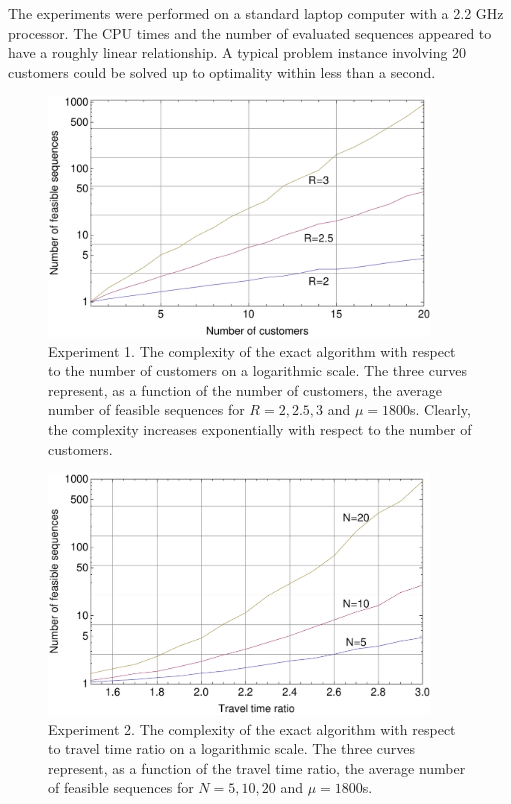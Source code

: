 \documentclass[dissertation,draft*]{aaltoseries}
\begin{document}
The experiments were performed on a standard laptop computer with a 2.2 GHz processor. 
The CPU times and the number of evaluated sequences appeared to have a roughly linear relationship.
A typical problem instance involving 20 customers could be solved up to optimality within less than a second.

\begin{figure}[ht]
\begin{center}
\includegraphics[width=0.9\textwidth]{nvertailu01.pdf}
\caption{Experiment 1. The complexity of the exact algorithm with respect to the number of customers on a logarithmic scale. 
The three curves represent, as a function of the number of customers, the average number of feasible sequences 
for $R=2,2.5,3$ and $\mu=1800$s. Clearly, the complexity increases exponentially with respect
to the number of customers.}
\label{nvertailu01}
\end{center}
\end{figure}



\begin{figure}[ht]
\begin{center}
\includegraphics[width=0.9\textwidth]{ttivertailu01.pdf}
\caption{Experiment 2. The complexity of the exact algorithm with respect to travel time ratio on a logarithmic scale. 
The three curves represent, as a function of the travel time ratio, the average number of feasible sequences
for $N=5,10,20$ and $\mu = 1800$s.}
\label{ttivertailu01}
\end{center}
\end{figure}
\end{document}
